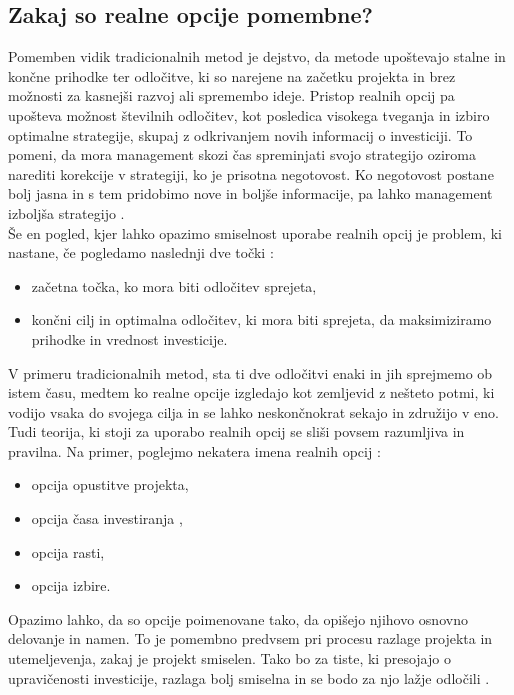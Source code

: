 \subsection{Zakaj so realne opcije pomembne?}
Pomemben vidik tradicionalnih metod je dejstvo, da metode upoštevajo stalne in končne prihodke ter odločitve, ki so narejene na začetku projekta in brez možnosti za kasnejši razvoj ali spremembo ideje. Pristop realnih opcij pa upošteva možnost številnih odločitev, kot posledica visokega tveganja in izbiro optimalne strategije, skupaj z odkrivanjem novih informacij o investiciji. To pomeni, da mora management skozi čas spreminjati svojo strategijo oziroma narediti korekcije v strategiji, ko je prisotna negotovost. Ko negotovost postane bolj jasna in s tem pridobimo nove in boljše informacije, pa lahko management izboljša strategijo \cite[str. 92]{Mun}. \\

Še en pogled, kjer lahko opazimo smiselnost uporabe realnih opcij je problem, ki nastane, če pogledamo naslednji dve točki \cite[str. 92]{Mun}:
\begin{itemize}
\item začetna točka, ko mora biti odločitev sprejeta,
\item končni cilj in optimalna odločitev, ki mora biti sprejeta, da maksimiziramo prihodke in vrednost investicije.
\end{itemize}
V primeru tradicionalnih metod, sta ti dve odločitvi enaki in jih sprejmemo ob istem času, medtem ko realne opcije izgledajo kot zemljevid z nešteto potmi, ki vodijo vsaka do svojega cilja in se lahko neskončnokrat sekajo in združijo v eno. \\

Tudi teorija, ki stoji za uporabo realnih opcij se sliši povsem razumljiva in pravilna. Na primer, poglejmo nekatera imena realnih opcij \cite[str. 93]{Mun}:
\begin{itemize}
\item opcija opustitve projekta,
\item opcija časa investiranja ,
\item opcija rasti,
\item opcija izbire.
\end{itemize}
Opazimo lahko, da so opcije poimenovane tako, da opišejo njihovo osnovno delovanje in namen. To je pomembno predvsem pri procesu razlage projekta in utemeljevenja, zakaj je projekt smiselen. Tako bo za tiste, ki presojajo o upravičenosti investicije, razlaga bolj smiselna in se bodo za njo lažje odločili \cite[str. 93]{Mun}. \\

